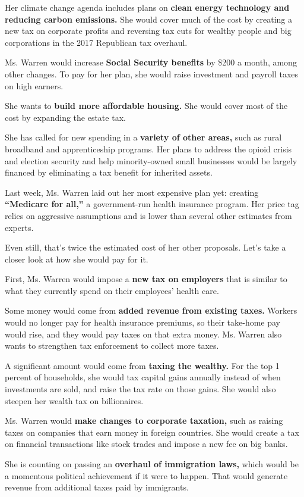 Her climate change agenda includes plans on \textbf{clean energy
technology and reducing carbon emissions.} She would cover much of the
cost by creating a new tax on corporate profits and reversing tax cuts
for wealthy people and big corporations in the 2017 Republican tax
overhaul.

Ms. Warren would increase \textbf{Social Security benefits} by \$200 a
month, among other changes. To pay for her plan, she would raise
investment and payroll taxes on high earners.

She wants to \textbf{build more affordable housing.} She would cover
most of the cost by expanding the estate tax.

She has called for new spending in a \textbf{variety of other areas,}
such as rural broadband and apprenticeship programs. Her plans to
address the opioid crisis and election security and help minority-owned
small businesses would be largely financed by eliminating a tax benefit
for inherited assets.

Last week, Ms. Warren laid out her most expensive plan yet: creating
\textbf{``Medicare for all,''} a government-run health insurance
program. Her price tag relies on aggressive assumptions and is lower
than several other estimates from experts.

Even still, that's twice the estimated cost of her other proposals.
Let's take a closer look at how she would pay for it.

First, Ms. Warren would impose a \textbf{new tax on employers} that is
similar to what they currently spend on their employees' health care.

Some money would come from \textbf{added revenue from existing taxes.}
Workers would no longer pay for health insurance premiums, so their
take-home pay would rise, and they would pay taxes on that extra money.
Ms. Warren also wants to strengthen tax enforcement to collect more
taxes.

A significant amount would come from \textbf{taxing the wealthy.} For
the top 1 percent of households, she would tax capital gains annually
instead of when investments are sold, and raise the tax rate on those
gains. She would also steepen her wealth tax on billionaires.

Ms. Warren would \textbf{make changes to corporate taxation,} such as
raising taxes on companies that earn money in foreign countries. She
would create a tax on financial transactions like stock trades and
impose a new fee on big banks.

She is counting on passing an \textbf{overhaul of immigration laws,}
which would be a momentous political achievement if it were to happen.
That would generate revenue from additional taxes paid by immigrants.

